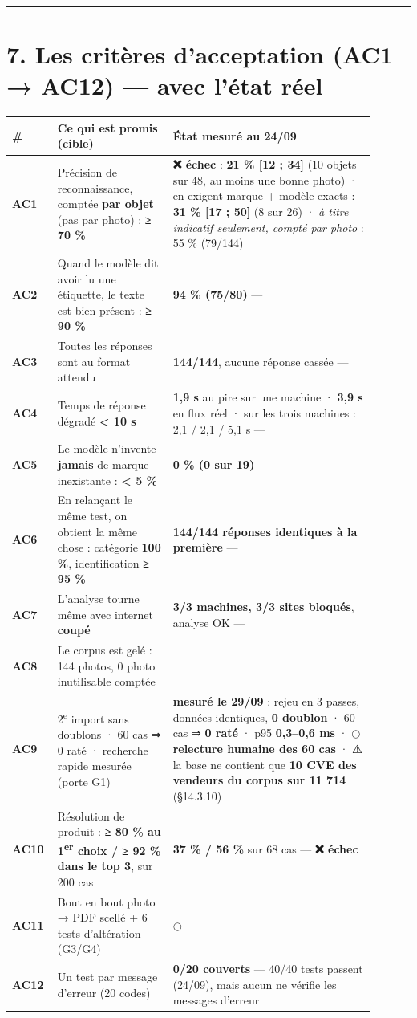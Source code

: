 \documentclass[11pt,a4paper]{article}
\newcommand{\fait}{\textcolor{green!45!black}{\ding{51}}}      %
\newcommand{\encours}{\textcolor{blue!65!black}{\ding{46}}}   %
\newcommand{\afaire}{\textcolor{orange!85!black}{$\bigcirc$}}  %
\begin{document}
\medskip\hrule\medskip
\section*{7. Les critères d'acceptation (AC1 → AC12) — avec l'état réel}
\sloppy
\begin{longtable}{|p{0.081\linewidth}|p{0.297\linewidth}|p{0.519\linewidth}|}
\hline
\textbf{\#} & \textbf{Ce qui est promis (cible)} & \textbf{État mesuré au 24/09} \\ \hline
\endhead
\textbf{AC1} & Précision de reconnaissance, comptée \textbf{par objet} (pas par photo) : \textbf{≥ 70 \%} & \textbf{❌ échec} : \textbf{21 \% [12 ; 34]} (10 objets sur 48, au moins une bonne photo) · en exigent marque + modèle exacts : \textbf{31 \% [17 ; 50]} (8 sur 26) · \textit{à titre indicatif seulement, compté par photo} : 55 \% (79/144) \\ \hline
\textbf{AC2} & Quand le modèle dit avoir lu une étiquette, le texte est bien présent : \textbf{≥ 90 \%} & \textbf{94 \% (75/80)} — \fait \\ \hline
\textbf{AC3} & Toutes les réponses sont au format attendu & \textbf{144/144}, aucune réponse cassée — \fait \\ \hline
\textbf{AC4} & Temps de réponse dégradé \textbf{< 10 s} & \textbf{1,9 s} au pire sur une machine · \textbf{3,9 s} en flux réel · sur les trois machines : 2,1 / 2,1 / 5,1 s — \fait \\ \hline
\textbf{AC5} & Le modèle n'invente \textbf{jamais} de marque inexistante : \textbf{< 5 \%} & \textbf{0 \% (0 sur 19)} — \fait \\ \hline
\textbf{AC6} & En relançant le même test, on obtient la même chose : catégorie \textbf{100 \%}, identification \textbf{≥ 95 \%} & \textbf{144/144 réponses identiques à la première} — \fait \\ \hline
\textbf{AC7} & L'analyse tourne même avec internet \textbf{coupé} & \textbf{3/3 machines, 3/3 sites bloqués}, analyse OK — \fait \\ \hline
\textbf{AC8} & Le corpus est gelé : 144 photos, 0 photo inutilisable comptée & \fait \\ \hline
\textbf{AC9} & 2\textsuperscript{e} import sans doublons · 60 cas ⇒ 0 raté · recherche rapide mesurée (porte G1) & \textbf{\fait mesuré le 29/09} : rejeu en 3 passes, données identiques, \textbf{0 doublon} · 60 cas ⇒ \textbf{0 raté} · p95 \textbf{0,3–0,6 ms} · \afaire \textbf{relecture humaine des 60 cas} · ⚠️ la base ne contient que \textbf{10 CVE des vendeurs du corpus sur 11 714} (§14.3.10) \\ \hline
\textbf{AC10} & Résolution de produit : \textbf{≥ 80 \% au 1\textsuperscript{er} choix / ≥ 92 \% dans le top 3}, sur 200 cas & \textbf{37 \% / 56 \%} sur 68 cas — \textbf{❌ échec} \\ \hline
\textbf{AC11} & Bout en bout photo → PDF scellé + 6 tests d'altération (G3/G4) & \afaire \\ \hline
\textbf{AC12} & Un test par message d'erreur (20 codes) & \textbf{0/20 couverts} — \encours 40/40 tests passent (24/09), mais aucun ne vérifie les messages d'erreur \\ \hline
\end{longtable}
\end{document}
